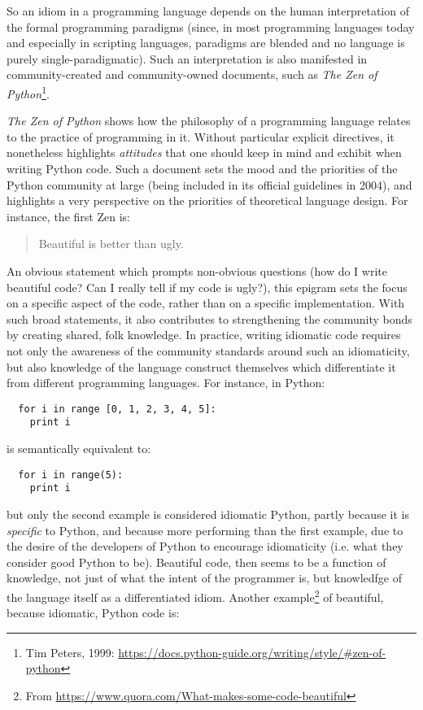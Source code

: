 \documentclass{article}
\begin{document}
So an idiom in a programming language depends on the human interpretation of the formal programming paradigms (since, in most programming languages today and especially in scripting languages, paradigms are blended and no language is purely single-paradigmatic). Such an interpretation is also manifested in community-created and community-owned documents, such as \emph{The Zen of Python}\footnote{Tim Peters, 1999: \url{https://docs.python-guide.org/writing/style/#zen-of-python}}.

\emph{The Zen of Python} shows how the philosophy of a programming language relates to the practice of programming in it. Without particular explicit directives, it nonetheless highlights \emph{attitudes} that one should keep in mind and exhibit when writing Python code. Such a document sets the mood and the priorities of the Python community at large (being included in its official guidelines in 2004), and highlights a very perspective on the priorities of theoretical language design. For instance, the first Zen is:

\begin{quote}
  Beautiful is better than ugly.
\end{quote}

An obvious statement which prompts non-obvious questions (how do I write beautiful code? Can I really tell if my code is ugly?), this epigram sets the focus on a specific aspect of the code, rather than on a specific implementation. With such broad statements, it also contributes to strengthening the community bonds by creating shared, folk knowledge. In practice, writing idiomatic code requires not only the awareness of the community standards around such an idiomaticity, but also knowledge of the language construct themselves which differentiate it from different programming languages. For instance, in Python:

\begin{lstlisting}
  for i in range [0, 1, 2, 3, 4, 5]:
    print i
\end{lstlisting}

is semantically equivalent to:

\begin{lstlisting}
  for i in range(5):
    print i
\end{lstlisting}

but only the second example is considered idiomatic Python, partly because it is \emph{specific} to Python, and because more performing than the first example, due to the desire of the developers of Python to encourage idiomaticity (i.e. what they consider good Python to be). Beautiful code, then seems to be a function of knowledge, not just of what the intent of the programmer is, but knowledfge of the language itself as a differentiated idiom. Another example\footnote{From \url{https://www.quora.com/What-makes-some-code-beautiful}} of beautiful, because idiomatic, Python code is:
\end{document}
